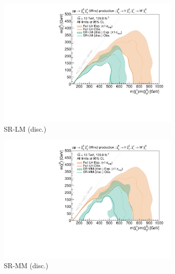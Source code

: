 \begin{figure}
	\centering
	\begin{subfigure}[b]{0.5\textwidth}
		\centering\includegraphics[width=\textwidth]{exclusion_1Lbb_SRLM_noLabel_v2}
		\caption{SR-LM (disc.)\label{fig:single_bin_SRLM}}
	\end{subfigure}\hfill
	\begin{subfigure}[b]{0.5\textwidth}
		\centering\includegraphics[width=\textwidth]{exclusion_1Lbb_SRMM_noLabel_v2}
		\caption{SR-MM (disc.)\label{fig:single_bin_SRMM}}
	\end{subfigure}\hfill
	\par\bigskip
	\begin{subfigure}[b]{0.5\textwidth}

\end{subfigure}
\end{figure}
